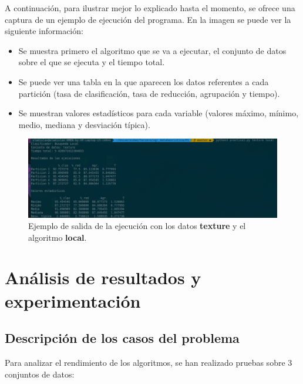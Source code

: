 \documentclass[11pt,a4paper]{article}
\begin{document}
A continuación, para ilustrar mejor lo explicado hasta el momento, se ofrece una captura de un ejemplo de ejecución del
programa. En la imagen se puede ver la siguiente información:

\begin{itemize}[label=\textbullet]
	\item Se muestra primero el algoritmo que se va a ejecutar, el conjunto de datos sobre el que se ejecuta y el tiempo
	total.
	\item Se puede ver una tabla en la que aparecen los datos referentes a cada partición (tasa de clasificación, tasa de
	reducción, agrupación y tiempo).
	\item Se muestran valores estadísticos para cada variable (valores máximo, mínimo, medio, mediana y desviación típica).
\end{itemize}


\begin{figure}[H]
\centering
\includegraphics[scale=0.35]{img/out_example.png}
\caption{Ejemplo de salida de la ejecución con los datos \textbf{texture} y el algoritmo \textbf{local}.}
\end{figure}

\newpage

\section{Análisis de resultados y experimentación}

\subsection{Descripción de los casos del problema}

Para analizar el rendimiento de los algoritmos, se han realizado pruebas sobre 3 conjuntos de datos:
\end{document}
